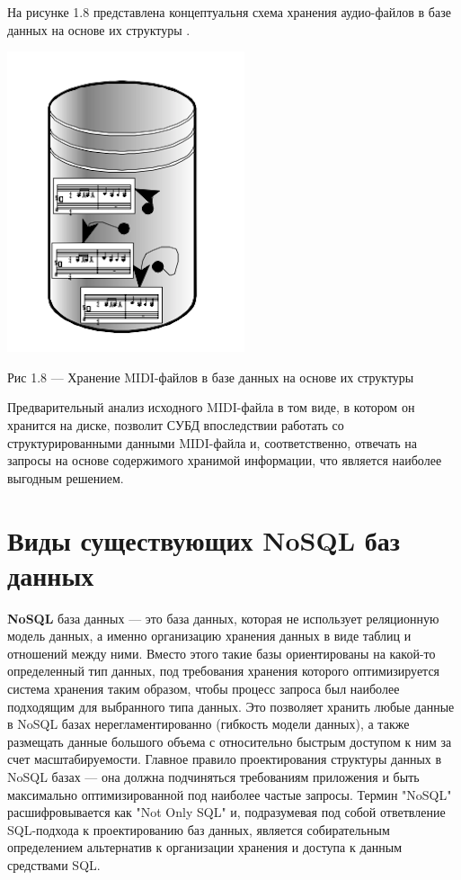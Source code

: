 На рисунке 1.8 представлена концептуальня схема хранения аудио-файлов в базе данных на основе их структуры \cite{CBMS}.
\begin{center}
		\includegraphics[scale=0.7]{img/musical_scores}
		
			Рис 1.8 — Хранение MIDI-файлов в базе данных на основе их структуры
\end{center} 

Предварительный анализ исходного MIDI-файла в том виде, в котором он хранится на диске, позволит СУБД впоследствии работать со структурированными данными MIDI-файла и, соответственно, отвечать на запросы на основе содержимого хранимой информации, что является наиболее выгодным решением.

\section{Виды существующих NoSQL баз данных}
 \textbf{NoSQL} база данных \cite{WNOSQL} — это база данных, которая не использует реляционную модель данных, а именно организацию хранения данных в виде таблиц и отношений между ними. Вместо этого такие базы ориентированы на какой-то определенный тип данных, под требования хранения которого оптимизируется система хранения таким образом, чтобы процесс запроса был наиболее подходящим для выбранного типа данных. Это позволяет хранить любые данные в NoSQL базах нерегламентированно (гибкость модели данных), а также размещать данные большого объема с относительно быстрым доступом к ним за счет масштабируемости. Главное правило проектирования структуры данных в NoSQL базах — она должна подчиняться требованиям приложения и быть максимально оптимизированной под наиболее частые запросы. Термин "NoSQL" расшифровывается как "Not Only SQL" и, подразумевая под собой ответвление SQL-подхода к проектированию баз данных, является собирательным определением альтернатив к организации хранения и доступа к данным средствами SQL. 
 
